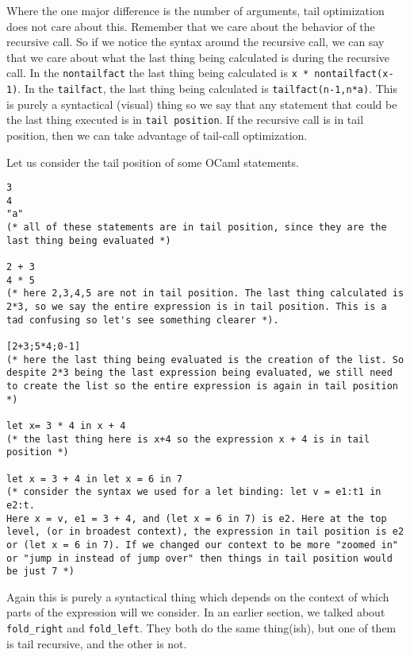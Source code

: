 \documentclass[main.tex]{subfiles}
\begin{document}
Where the one major difference is the number of arguments, tail optimization does not care about this. Remember that we care about the behavior of the recursive call. So if we notice the syntax around the recursive call, we can say that we care about what the last thing being calculated is during the recursive call.
In the \texttt{nontailfact} the last thing being calculated is \texttt{x * nontailfact(x-1)}. In the \texttt{tailfact}, the last thing being calculated is \texttt{tailfact(n-1,n*a)}. 
This is purely a syntactical (visual) thing so we say that any statement that could be the last thing executed is in \texttt{tail position}. If the recursive call is in tail position, then we can take advantage of tail-call optimization. 

Let us consider the tail position of some OCaml statements.
\begin{lstlisting}[style=Myocamlstyle]
3
4
"a"
(* all of these statements are in tail position, since they are the last thing being evaluated *)

2 + 3
4 * 5
(* here 2,3,4,5 are not in tail position. The last thing calculated is 2*3, so we say the entire expression is in tail position. This is a tad confusing so let's see something clearer *).

[2+3;5*4;0-1]
(* here the last thing being evaluated is the creation of the list. So despite 2*3 being the last expression being evaluated, we still need to create the list so the entire expression is again in tail position *)

let x= 3 * 4 in x + 4
(* the last thing here is x+4 so the expression x + 4 is in tail position *)

let x = 3 + 4 in let x = 6 in 7
(* consider the syntax we used for a let binding: let v = e1:t1 in e2:t. 
Here x = v, e1 = 3 + 4, and (let x = 6 in 7) is e2. Here at the top level, (or in broadest context), the expression in tail position is e2 or (let x = 6 in 7). If we changed our context to be more "zoomed in" or "jump in instead of jump over" then things in tail position would be just 7 *)
\end{lstlisting}

Again this is purely a syntactical thing which depends on the context of which parts of the expression will we consider. In an earlier section, we talked about \texttt{fold\_right} and \texttt{fold\_left}. They both do the same thing(ish), but one of them is tail recursive, and the other is not.
\end{document}
